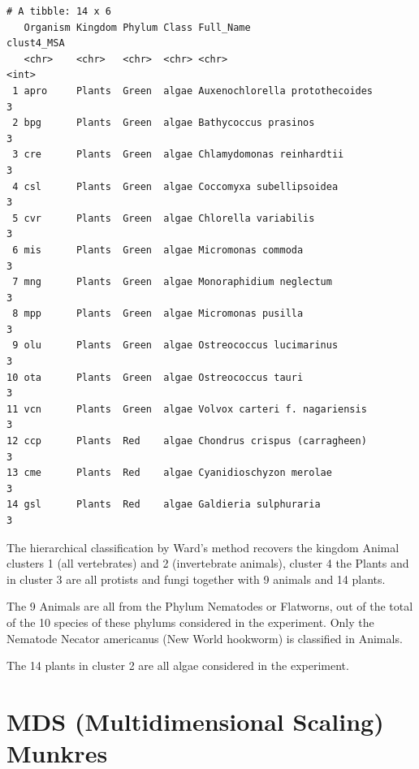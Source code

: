 \documentclass[
  letterpaper,
  DIV=11,
  numbers=noendperiod]{scrreprt}
\newenvironment{Shaded}{}{}
\newcommand{\AttributeTok}[1]{\textcolor[rgb]{0.78,0.47,0.87}{#1}}
\newcommand{\ConstantTok}[1]{\textcolor[rgb]{0.82,0.60,0.40}{#1}}
\newcommand{\DecValTok}[1]{\textcolor[rgb]{0.82,0.60,0.40}{#1}}
\newcommand{\DocumentationTok}[1]{\textcolor[rgb]{0.64,0.20,0.25}{#1}}
\newcommand{\FunctionTok}[1]{\textcolor[rgb]{0.38,0.69,0.94}{#1}}
\newcommand{\NormalTok}[1]{\textcolor[rgb]{0.67,0.70,0.75}{#1}}
\newcommand{\OtherTok}[1]{\textcolor[rgb]{0.15,0.68,0.38}{#1}}
\newcommand{\SpecialCharTok}[1]{\textcolor[rgb]{0.34,0.71,0.76}{#1}}
\begin{document}
\begin{verbatim}
# A tibble: 14 x 6
   Organism Kingdom Phylum Class Full_Name                      clust4_MSA
   <chr>    <chr>   <chr>  <chr> <chr>                               <int>
 1 apro     Plants  Green  algae Auxenochlorella protothecoides          3
 2 bpg      Plants  Green  algae Bathycoccus prasinos                    3
 3 cre      Plants  Green  algae Chlamydomonas reinhardtii               3
 4 csl      Plants  Green  algae Coccomyxa subellipsoidea                3
 5 cvr      Plants  Green  algae Chlorella variabilis                    3
 6 mis      Plants  Green  algae Micromonas commoda                      3
 7 mng      Plants  Green  algae Monoraphidium neglectum                 3
 8 mpp      Plants  Green  algae Micromonas pusilla                      3
 9 olu      Plants  Green  algae Ostreococcus lucimarinus                3
10 ota      Plants  Green  algae Ostreococcus tauri                      3
11 vcn      Plants  Green  algae Volvox carteri f. nagariensis           3
12 ccp      Plants  Red    algae Chondrus crispus (carragheen)           3
13 cme      Plants  Red    algae Cyanidioschyzon merolae                 3
14 gsl      Plants  Red    algae Galdieria sulphuraria                   3
\end{verbatim}

The hierarchical classification by Ward's method recovers the kingdom
Animal clusters 1 (all vertebrates) and 2 (invertebrate animals),
cluster 4 the Plants and in cluster 3 are all protists and fungi
together with 9 animals and 14 plants.

The 9 Animals are all from the Phylum Nematodes or Flatworns, out of the
total of the 10 species of these phylums considered in the experiment.
Only the Nematode Necator americanus (New World hookworm) is classified
in Animals.

The 14 plants in cluster 2 are all algae considered in the experiment.

\hypertarget{mds-multidimensional-scaling-munkres}{%
\section{MDS (Multidimensional Scaling)
Munkres}\label{mds-multidimensional-scaling-munkres}}

\begin{Shaded}
\end{Shaded}
\end{document}
